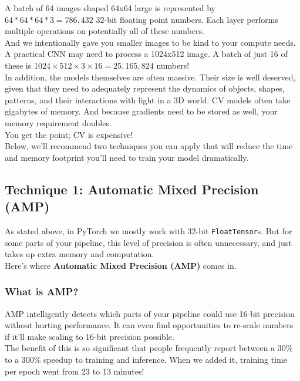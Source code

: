 \documentclass{article}
\newcommand{\ttt}[1]{\texttt{#1}}
\begin{document}
A batch of 64 images shaped 64x64 large is represented by $64*64*64*3=786,432$ 32-bit floating point numbers. Each layer performs multiple operations on potentially all of these numbers. \\

And we intentionally gave you smaller images to be kind to your compute needs. A practical CNN may need to process a 1024x512 image. A batch of just 16 of these is $1024\times512\times3\times16=25,165,824$ numbers! \\

In addition, the models themselves are often massive. Their size is well deserved, given that they need to adequately represent the dynamics of objects, shapes, patterns, and their interactions with light in a 3D world. CV models often take gigabytes of memory. And because gradients need to be stored as well, your memory requirement doubles. \\

You get the point; CV is expensive! \\

Below, we'll recommend two techniques you can apply that will reduce the time and memory footprint you'll need to train your model dramatically.

\newpage

\subsection{Technique 1: Automatic Mixed Precision (AMP)}

As stated above, in PyTorch we mostly work with 32-bit \ttt{FloatTensor}s. But for some parts of your pipeline, this level of precision is often unnecessary, and just takes up extra memory and computation. \\

Here's where \textbf{Automatic Mixed Precision (AMP)} comes in.

\subsubsection{What is AMP?}

AMP intelligently detects which parts of your pipeline could use 16-bit precision without hurting performance. It can even find opportunities to re-scale numbers if it'll make scaling to 16-bit precision possible. \\

The benefit of this is so significant that people frequently report between a 30\% to a 300\% speedup to training and inference. When we added it, training time per epoch went from 23 to 13 minutes! \\
\end{document}
